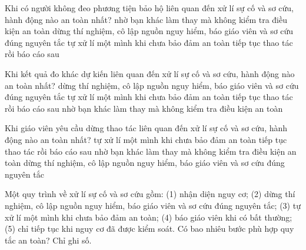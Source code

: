 \begin{ex}
Khi có người không đeo phương tiện bảo hộ liên quan đến xử lí sự cố và sơ cứu, hành động nào an toàn nhất?
\choice
{nhờ bạn khác làm thay mà không kiểm tra điều kiện an toàn}
{\True dừng thí nghiệm, cô lập nguồn nguy hiểm, báo giáo viên và sơ cứu đúng nguyên tắc}
{tự xử lí một mình khi chưa bảo đảm an toàn}
{tiếp tục thao tác rồi báo cáo sau}
\end{ex}

\begin{ex}
Khi kết quả đo khác dự kiến liên quan đến xử lí sự cố và sơ cứu, hành động nào an toàn nhất?
\choice
{\True dừng thí nghiệm, cô lập nguồn nguy hiểm, báo giáo viên và sơ cứu đúng nguyên tắc}
{tự xử lí một mình khi chưa bảo đảm an toàn}
{tiếp tục thao tác rồi báo cáo sau}
{nhờ bạn khác làm thay mà không kiểm tra điều kiện an toàn}
\end{ex}

\begin{ex}
Khi giáo viên yêu cầu dừng thao tác liên quan đến xử lí sự cố và sơ cứu, hành động nào an toàn nhất?
\choice
{tự xử lí một mình khi chưa bảo đảm an toàn}
{tiếp tục thao tác rồi báo cáo sau}
{nhờ bạn khác làm thay mà không kiểm tra điều kiện an toàn}
{\True dừng thí nghiệm, cô lập nguồn nguy hiểm, báo giáo viên và sơ cứu đúng nguyên tắc}
\end{ex}

\begin{ex}
Một quy trình về xử lí sự cố và sơ cứu gồm: (1) nhận diện nguy cơ; (2) dừng thí nghiệm, cô lập nguồn nguy hiểm, báo giáo viên và sơ cứu đúng nguyên tắc; (3) tự xử lí một mình khi chưa bảo đảm an toàn; (4) báo giáo viên khi có bất thường; (5) chỉ tiếp tục khi nguy cơ đã được kiểm soát. Có bao nhiêu bước phù hợp quy tắc an toàn? Chỉ ghi số.
\end{ex}

